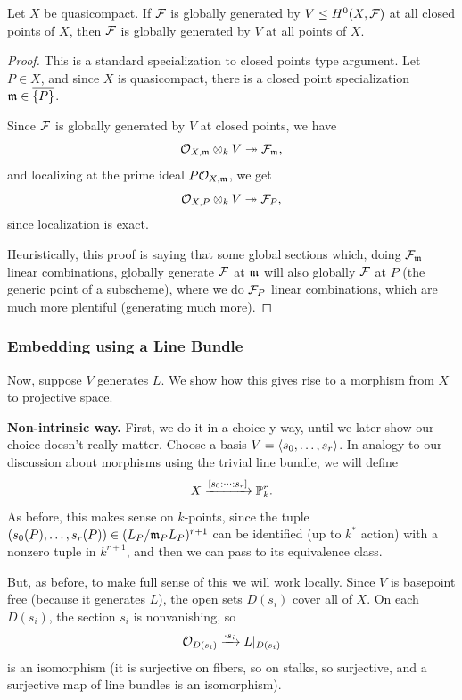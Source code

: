 \documentclass[12pt]{article}
\begin{document}
\begin{prop}
    Let $X$ be quasicompact. If $\cF$ is globally generated by $V\leq H^0(X,\cF)$ at all closed points of $X$, then $\cF$ is globally generated by $V$ at all points of $X$.
\end{prop}

\begin{proof}
    This is a standard specialization to closed points type argument. Let $P\in X$, and since $X$ is quasicompact, there is a closed point specialization $\fm\in \overline{\{P\}}$.

    Since $\cF$ is globally generated by $V$ at closed points, we have
    \[\cO_{X,\fm} \otimes_k V \twoheadrightarrow \cF_\fm,\]
    and localizing at the prime ideal $P\cO_{X,\fm}$, we get
    \[\cO_{X,P} \otimes_k V \twoheadrightarrow \cF_P,\]
    since localization is exact.

    Heuristically, this proof is saying that some global sections which, doing $\cF_\fm$ linear combinations, globally generate $\cF$ at $\fm$ will also globally $\cF$ at $P$ (the generic point of a subscheme), where we do $\cF_P$ linear combinations, which are much more plentiful (generating much more).
\end{proof}

\subsubsection{Embedding using a Line Bundle}
Now, suppose $V$ generates $L$. We show how this gives rise to a morphism from $X$ to projective space.

\textbf{Non-intrinsic way.} First, we do it in a choice-y way, until we later show our choice doesn't really matter. Choose a basis $V=\<s_0,\dots,s_r\>$. In analogy to our discussion about morphisms using the trivial line bundle, we will define
\[X \xrightarrow{[s_0: \cdots : s_r]} \P^r_k.\]
As before, this makes sense on $k$-points, since the tuple $(s_0(P),\dots,s_r(P)) \in (L_P/\fm_P L_P)^{r+1}$ can be identified (up to $k^*$ action) with a nonzero tuple in $k^{r+1}$, and then we can pass to its equivalence class.

But, as before, to make full sense of this we will work locally. Since $V$ is basepoint free (because it generates $L$), the open sets $D(s_i)$ cover all of $X$. On each $D(s_i)$, the section $s_i$ is nonvanishing, so
\[\cO_{D(s_i)} \xrightarrow{\cdot s_i} L|_{D(s_i)}\]
is an isomorphism (it is surjective on fibers, so on stalks, so surjective, and a surjective map of line bundles is an isomorphism).
\end{document}
